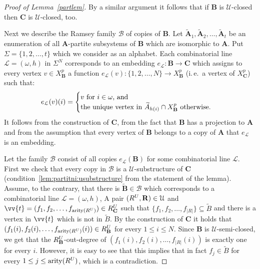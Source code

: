 \documentclass{elsarticle}
\newcommand{\ie}{i.\,e.}
\def\str#1{\mathbf {#1}}
\def\arity#1{\mathop{\mathrm{arity}}\nolimits(\rel{}{#1})}
\def\nbrel#1#2{R\ifstrempty{#1}{}{_{#1}}\ifstrempty{#2}{}{^{#2}}}
\def\rel#1#2{\nbrel{\ifstrempty{#1}{}{\str{#1}}}{#2}}
\theoremstyle{plain}
\theoremstyle{definition}
\theoremstyle{remark}
\begin{document}
\begin{proof}[Proof of Lemma~\ref{partlem}]
By a similar argument it follows that if $\str{B}$ is $\mathcal U$-closed then $\str{C}$ is $\mathcal U$-closed, too.

\medskip
Next we describe the Ramsey family $\mathcal B$ of copies of $\str B$.
Let $\widetilde{\str{A}}_1, \widetilde{\str{A}}_2,\ldots, \widetilde{\str{A}}_t$ be an enumeration of all $\str{A}$-partite subsystems of $\str{B}$ which are isomorphic to $\str{A}$. 
Put  $\Sigma=\{1,2,\ldots, t\}$ which we consider as an alphabet.
Each combinatorial line $\mathcal L=(\omega, h)$ in $\Sigma^N$ corresponds to an embedding $e_\mathcal L\colon\str{B}\to \str{C}$ which assigns to every vertex $v\in X^p_\str{B}$ a function $e_\mathcal L(v)\colon\{1,2,\ldots, N\}\to X^p_\str{B}$ (\ie{}\ a vertex of $X^p_\str{C}$) such that:
$$e_\mathcal L(v)(i)=
 \begin{cases} 
    \hbox{$v$ for $i\in \omega$, and}\\
    \hbox{the unique vertex in $\widetilde A_{h(i)}\cap X^p_\str{B}$ otherwise.}
   \end{cases}
$$
It follows from the construction of $\str{C}$, from the fact that $\str{B}$ has a projection to $\str{A}$ and from the assumption that every vertex of $\str{B}$ belongs to a copy of $\str{A}$ that $e_\mathcal L$ is an embedding.

Let the family $\mathcal B$ consist of all copies $e_\mathcal L(\str{B})$ for some combinatorial line $\mathcal L$.
First we check that every copy in $\mathcal B$ is a $\mathcal U$-substructure of $\str{C}$ (condition~\ref{lem:partitni:usubstructure} from the statement of the lemma).
Assume, to the contrary,
that there is $\widetilde{\str{B}} \in \mathcal{B}$ which corresponds to a combinatorial line $\mathcal L = (\omega, h)$, A pair $(\rel{}{U}, \str{R}) \in \mathcal U$ and
$\vv{t}=(f_1,f_2,\ldots, f_{\arity{U}}) \in \rel{C}{U}$ such that $\{f_1, f_2, \ldots, f_{\vert R\vert}\}\subseteq \widetilde{B}$ and there is a vertex
in $\vv{t}$ which is not in $\widetilde{B}$. 
By the construction of $\str C$ it holds that $(f_1(i),f_2(i),\ldots, f_{\arity{U}}(i))\in \rel{B}{U}$ for every $1\leq i\leq N$. Since $\str B$ is $\mathcal U$-semi-closed, we get that the $\rel{B}{U}$-out-degree of $(f_1(i),\allowbreak f_2(i), \ldots,\allowbreak f_{\vert R\vert}(i))$ is exactly one for every $i$. However, it is easy to see that this implies that in fact $f_j\in \widetilde{B}$ for every $1\leq j\leq \arity{U}$, which is a contradiction.


\end{proof}
\end{document}
